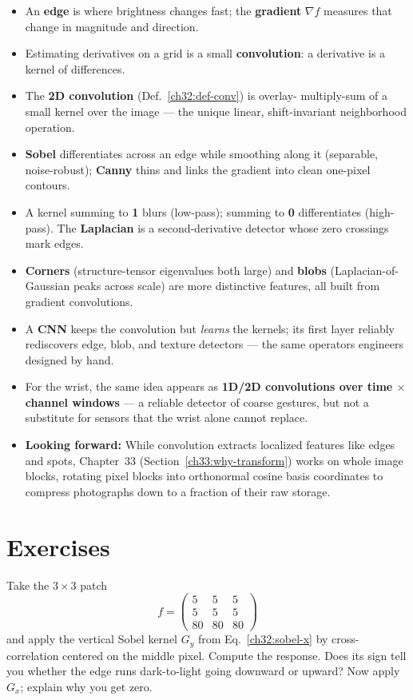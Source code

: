 \begin{itemize}
\item An \textbf{edge} is where brightness changes fast; the \textbf{gradient}
$\nabla f$ measures that change in magnitude and direction.
\item Estimating derivatives on a grid is a small \textbf{convolution}: a
derivative is a kernel of differences.
\item The \textbf{2D convolution} (Def.~\ref{ch32:def-conv}) is overlay-
multiply-sum of a small kernel over the image --- the unique linear,
shift-invariant neighborhood operation.
\item \textbf{Sobel} differentiates across an edge while smoothing along it
(separable, noise-robust); \textbf{Canny} thins and links the gradient into
clean one-pixel contours.
\item A kernel summing to \textbf{1} blurs (low-pass); summing to \textbf{0}
differentiates (high-pass). The \textbf{Laplacian} is a second-derivative
detector whose zero crossings mark edges.
\item \textbf{Corners} (structure-tensor eigenvalues both large) and
\textbf{blobs} (Laplacian-of-Gaussian peaks across scale) are more distinctive
features, all built from gradient convolutions.
\item A \textbf{CNN} keeps the convolution but \emph{learns} the kernels; its
first layer reliably rediscovers edge, blob, and texture detectors --- the same
operators engineers designed by hand.
\item For the wrist, the same idea appears as \textbf{1D/2D convolutions over
time $\times$ channel windows} --- a reliable detector of coarse gestures, but
not a substitute for sensors that the wrist alone cannot replace.
\item \textbf{Looking forward:} While convolution extracts localized features like
edges and spots, Chapter~33 (Section~\ref{ch33:why-transform}) works on whole image blocks,
rotating pixel blocks into orthonormal cosine basis coordinates to compress
photographs down to a fraction of their raw storage.
\end{itemize}

\section{Exercises}
\label{ch32:exercises}

\begin{exercise}
\label{ch32:ex-byhand2}
Take the $3\times3$ patch
\[
f = \begin{pmatrix} 5 & 5 & 5 \\ 5 & 5 & 5 \\ 80 & 80 & 80 \end{pmatrix}
\]
and apply the vertical Sobel kernel
$G_y$ from Eq.~\eqref{ch32:sobel-x} by cross-correlation centered on the middle
pixel. Compute the response. Does its sign tell you whether the edge runs
dark-to-light going downward or upward? Now apply $G_x$; explain why you get
zero.
\end{exercise}

